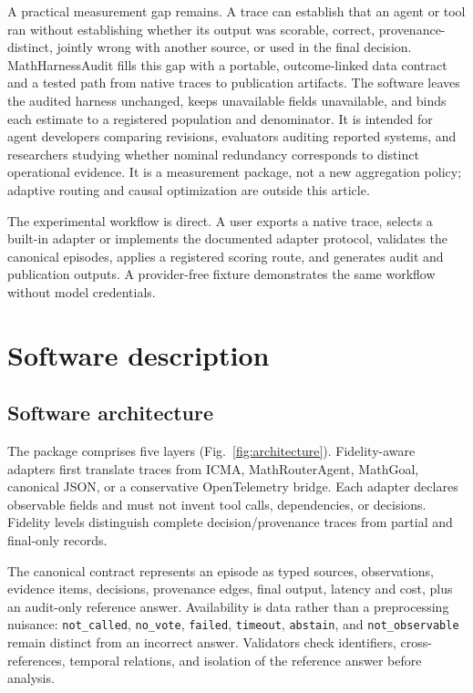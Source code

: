 \documentclass[preprint,12pt,a4paper]{elsarticle}
\begin{document}
A practical measurement gap remains. A trace can establish that an agent or
tool ran without establishing whether its output was scorable, correct,
provenance-distinct, jointly wrong with another source, or used in the final
decision. MathHarnessAudit fills this gap with a portable, outcome-linked data
contract and a tested path from native traces to publication artifacts. The
software leaves the audited harness unchanged, keeps unavailable fields
unavailable, and binds each estimate to a registered population and denominator.
It is intended for agent developers comparing revisions, evaluators auditing
reported systems, and researchers studying whether nominal redundancy
corresponds to distinct operational evidence. It is a measurement package, not
a new aggregation policy; adaptive routing and causal optimization are outside
this article.

The experimental workflow is direct. A user exports a native trace, selects a
built-in adapter or implements the documented adapter protocol, validates the
canonical episodes, applies a registered scoring route, and generates audit and
publication outputs. A provider-free fixture demonstrates the same workflow
without model credentials.

\section{Software description}
\label{sec:software}

\subsection{Software architecture}

The package comprises five layers (Fig.~\ref{fig:architecture}). Fidelity-aware adapters first translate traces
from ICMA, MathRouterAgent, MathGoal, canonical JSON, or a conservative
OpenTelemetry bridge. Each adapter declares observable fields and must not
invent tool calls, dependencies, or decisions. Fidelity levels distinguish
complete decision/provenance traces from partial and final-only records.

The canonical contract represents an episode as typed sources, observations,
evidence items, decisions, provenance edges, final output, latency and cost,
plus an audit-only reference answer. Availability is data rather than a
preprocessing nuisance: \texttt{not\_called}, \texttt{no\_vote},
\texttt{failed}, \texttt{timeout}, \texttt{abstain}, and
\texttt{not\_observable} remain distinct from an incorrect answer. Validators
check identifiers, cross-references, temporal relations, and isolation of the
reference answer before analysis.
\end{document}
